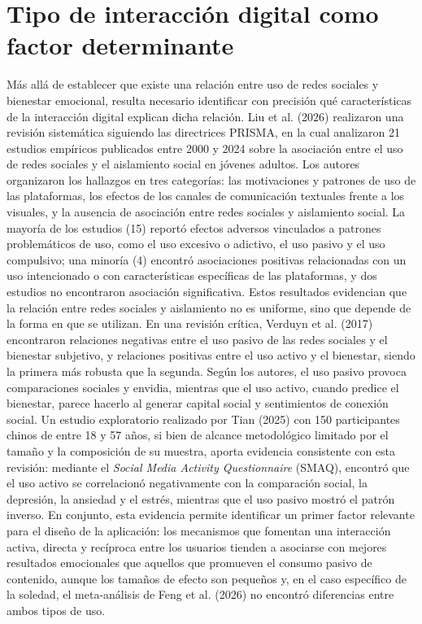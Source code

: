 \section{Tipo de interacción digital como factor determinante}
Más allá de establecer que existe una relación entre uso de redes sociales y bienestar emocional, resulta necesario identificar con precisión qué características de la interacción digital explican dicha relación.
Liu et al. (2026) realizaron una revisión sistemática siguiendo las directrices PRISMA, en la cual analizaron 21 estudios empíricos publicados entre 2000 y 2024 sobre la asociación entre el uso de redes sociales y el aislamiento social en jóvenes adultos. Los autores organizaron los hallazgos en tres categorías: las motivaciones y patrones de uso de las plataformas, los efectos de los canales de comunicación textuales frente a los visuales, y la ausencia de asociación entre redes sociales y aislamiento social. La mayoría de los estudios (15) reportó efectos adversos vinculados a patrones problemáticos de uso, como el uso excesivo o adictivo, el uso pasivo y el uso compulsivo; una minoría (4) encontró asociaciones positivas relacionadas con un uso intencionado o con características específicas de las plataformas, y dos estudios no encontraron asociación significativa. Estos resultados evidencian que la relación entre redes sociales y aislamiento no es uniforme, sino que depende de la forma en que se utilizan.
En una revisión crítica, Verduyn et al. (2017) encontraron relaciones negativas entre el uso pasivo de las redes sociales y el bienestar subjetivo, y relaciones positivas entre el uso activo y el bienestar, siendo la primera más robusta que la segunda. Según los autores, el uso pasivo provoca comparaciones sociales y envidia, mientras que el uso activo, cuando predice el bienestar, parece hacerlo al generar capital social y sentimientos de conexión social. Un estudio exploratorio realizado por Tian (2025) con 150 participantes chinos de entre 18 y 57 años, si bien de alcance metodológico limitado por el tamaño y la composición de su muestra, aporta evidencia consistente con esta revisión: mediante el \textit{Social Media Activity Questionnaire} (SMAQ), encontró que el uso activo se correlacionó negativamente con la comparación social, la depresión, la ansiedad y el estrés, mientras que el uso pasivo mostró el patrón inverso.
En conjunto, esta evidencia permite identificar un primer factor relevante para el diseño de la aplicación: los mecanismos que fomentan una interacción activa, directa y recíproca entre los usuarios tienden a asociarse con mejores resultados emocionales que aquellos que promueven el consumo pasivo de contenido, aunque los tamaños de efecto son pequeños y, en el caso específico de la soledad, el meta-análisis de Feng et al. (2026) no encontró diferencias entre ambos tipos de uso.

